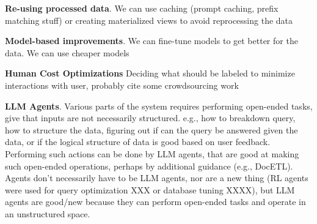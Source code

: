 \textbf{Re-using processed data}. We can use caching (prompt caching, prefix matching stuff) or creating materialized views to avoid reprocessing the data


\textbf{Model-based improvements}. We can fine-tune models to get better for the data. We can use cheaper models 

\textbf{Human Cost Optimizations} Deciding what should be labeled to minimize interactions with user, probably cite some crowdsourcing work

\textbf{LLM Agents}. Various parts of the system requires performing open-ended tasks, give that inputs are not necessarily structured. e.g., how to breakdown query, how to structure the data, figuring out if can the query be answered given the data, or if the logical structure of data is good based on user feedback.  Performing such actions can be done by LLM agents, that are good at making such open-ended operations, perhaps by additional guidance (e.g., DocETL). Agents don't necessarily have to be LLM agents, nor are a new thing (RL agents were used for query optimization XXX or database tuning XXXX), but LLM agents are good/new because they can perform open-ended tasks and operate in an unstructured space.



